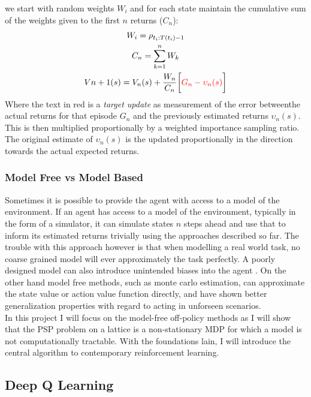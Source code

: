 we start with random weights $W_i$ and for each state maintain the cumulative sum of the weights
given to the first $n$ returns ($C_n$):
\begin{equation}
    \begin{gathered}
        W_i = \rho_{t_i : T(t_i) -1}\\
        C_n = \sum_{k = 1}^{n} W_k\\
        V{n+1}(s) = V_{n}(s) + \frac{W_n}{C_n} \biggl [\textcolor{red}{G_n -\upsilon_{n}(s)} \biggl]
    \end{gathered}
\end{equation}
Where the text in red is a \emph{target update} as measurement of the error betweenthe actual returns for that episode $G_n$ and
the previously estimated returns $\upsilon_n(s)$. This is then multiplied proportionally by a
weighted importance sampling ratio. The original estimate of $\upsilon_n(s)$ is the updated
proportionally in the direction towards the actual expected returns.
\subsubsection{Model Free vs Model Based}
Sometimes it is possible to provide the agent with access to a model of the environment.
If an agent has access to a model of the environment, typically in the form of a simulator, it
can simulate states $n$ steps ahead and use that to inform its estimated returns trivially using
the approaches described so far. The trouble with this approach however is that when modelling
a real world task, no coarse grained model will ever approximately the task perfectly. A poorly 
designed model can also introduce unintended biases into the agent \cite{sutton2018reinforcement}.
On the other hand model free methods, such as monte carlo estimation, can approximate the state value or
action value function directly, and have shown better generalization properties with regard
to acting in unforseen scenarios.\\
In this project I will focus on the model-free off-policy methods
as I will show that the PSP problem on a lattice is a non-stationary MDP for which
a model is not computationally tractable. With the foundations lain, I will introduce
the central algorithm to contemporary reinforcement learning.
\subsection{Deep Q Learning}
